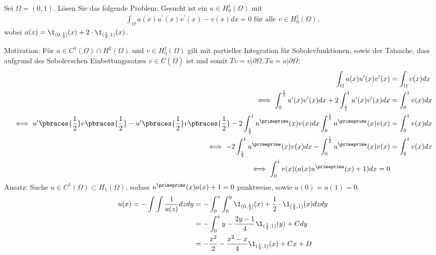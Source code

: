 
\begin{exercise}

Sei $\Omega = (0,1)$. Lösen Sie das folgende Problem: Gesucht ist ein $u \in H_0^1(\Omega)$ mit
\begin{align*}
  \int_\Omega a(x)u^{\prime}(x)v^{\prime}(x) - v(x) dx = 0 \text{ für alle } v \in H_0^1(\Omega),
\end{align*}
wobei $a(x) = \1_{(0,\frac{1}{2}]}(x) + 2\cdot\1_{(\frac{1}{2},1)}(x)$.
\end{exercise}


\begin{solution}
Motivation: Für $u \in C^1(\Omega) \cap H^2(\Omega)$ und $v \in H_0^1(\Omega)$ gilt
mit partieller Integration für Sobolevfunktionen, sowie der Tatsache, dass aufgrund
des Sobolevschen Einbettungssatzes $v \in C(\overline{\Omega})$ ist und somit
$Tv = v|\partial\Omega, Tu = u|\partial\Omega$:
\begin{align*}
  \int_\Omega a(x)u^{\prime}(x)v^{\prime}(x) &= \int_\Omega v(x) dx \\
  \iff \int_0^{\frac{1}{2}} u^{\prime}(x)v^{\prime}(x)dx + 2\int_{\frac{1}{2}}^1 u^{\prime}(x)v^{\prime}(x) dx &= \int_0^1 v(x) dx \\
  \iff u^{\prime}\pbraces{\frac{1}{2}}v\pbraces{\frac{1}{2}} - u^{\prime}\pbraces{\frac{1}{2}}v\pbraces{\frac{1}{2}} -
  2\int_{\frac{1}{2}}^1 u^{\primeprime}(x)v(x) dx \int_0^{\frac{1}{2}}u^{\primeprime}(x)v(x) &= \int_0^1 v(x) dx \\
  \iff - 2\int_{\frac{1}{2}}^1 u^{\primeprime}(x)v(x) dx - \int_0^{\frac{1}{2}}u^{\primeprime}(x)v(x) &= \int_0^1 v(x) dx \\
  \iff \int_0^1 v(x)(a(x)u^{\primeprime}(x) + 1) dx = 0
\end{align*}
Ansatz: Suche $u \in C^1(\Omega) \subset H_1(\Omega)$, sodass $u^{\primeprime}(x)a(x) + 1 = 0$ punktweise, sowie $u(0) = u(1) = 0$.
\begin{align*}
  u(x) = -\int\int \frac{1}{a(z)} dz dy  &=
  -\int_0^x\int_0^y \1_{(0,\frac{1}{2}]}(x) + \frac{1}{2}\cdot\1_{(\frac{1}{2},1)}(x) dz dy  \\
  &= -\int_0^x y - \frac{2y-1}{4}\1_{(\frac{1}{2},1)}(y) + C dy \\
  &= -\frac{x^2}{2} - \frac{x^2-x}{4}\1_{(\frac{1}{2},1)}(x) + Cx + D

\end{align*}
\end{solution}
